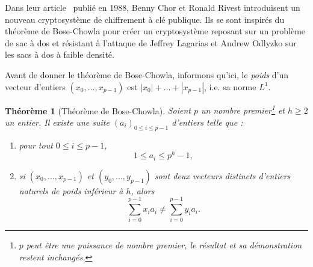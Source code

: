 \documentclass[a4paper, titlepage, 11pt]{article}
\newtheorem{theo}{Théorème}[section]
\theoremstyle{definition}
\theoremstyle{remark}
\begin{document}
Dans leur article~\cite{chorRivest1988} publié en 1988, Benny Chor et Ronald Rivest introduisent un nouveau cryptosystème de chiffrement à clé publique. Ils se sont inspirés du théorème de Bose-Chowla \cite{bose1962} pour créer un cryptosystème reposant sur un problème de sac à dos et résistant à l'attaque de Jeffrey Lagarias et Andrew Odlyzko \cite{lagarias1983} sur les sacs à dos à faible densité.

Avant de donner le théorème de Bose-Chowla, informons qu'ici, le \textit{poids} d'un vecteur d'entiers $(x_0, \dots, x_{p-1})$ est $|x_0| + \dots + |x_{p-1}|$, i.e. sa norme $L^1$.

\begin{theo}[Théorème de Bose-Chowla]
Soient $p$ un nombre premier\footnote{$p$ peut être une puissance de nombre premier, le résultat et sa démonstration restent inchangés.} et $h \geqslant 2$ un entier. Il existe une suite ${(a_i)}_{0\leqslant i \leqslant p-1}$ d'entiers telle que : \begin{enumerate}
\item pour tout $0 \leqslant i \leqslant p-1$, $$1 \leqslant a_i \leqslant p^h-1,$$
\item si $(x_0, \dots, x_{p-1})$ et $(y_0, \dots, y_{p-1})$ sont deux vecteurs distincts d'entiers naturels de poids inférieur à $h$, alors
$$\sum_{i=0}^{p-1} x_ia_i \neq \sum_{i=0}^{p-1} y_ia_i.$$
\end{enumerate}
\end{theo}
\end{document}
